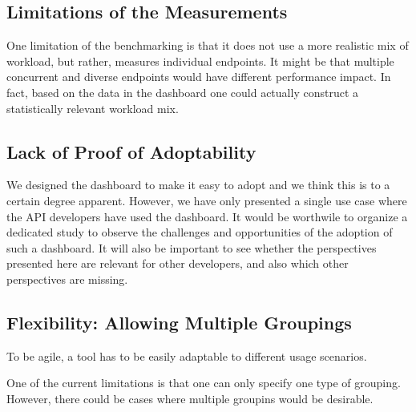   \subsection*{Limitations of the Measurements}
    One limitation of the benchmarking is that it does not use a more realistic mix of workload, but rather, measures individual endpoints. It might be that multiple concurrent and diverse endpoints would have different performance impact. In fact, based on the data in the dashboard one could actually construct a statistically relevant workload mix. 


  \subsection*{Lack of Proof of Adoptability}

    We designed the dashboard to make it easy to adopt and we think this is to a certain degree apparent. However, we have only presented a single use case where the API developers have used the dashboard. It would be worthwile to organize a dedicated study to observe the challenges and opportunities of the adoption of such a dashboard. It will also be important to see whether the perspectives presented here are relevant for other developers, and also which other perspectives are missing.





  \subsection*{Flexibility: Allowing Multiple Groupings}

    To be agile, a tool has to be easily adaptable to different usage scenarios. 

    One of the current limitations is that one can only specify one type of grouping. 
    However, there could be cases where multiple groupins would be desirable. 
    
